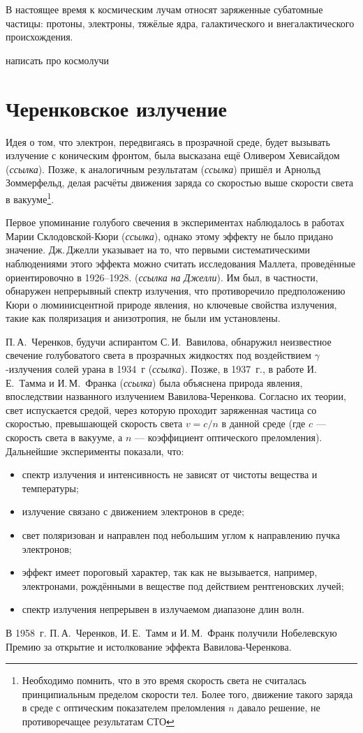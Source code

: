 \documentclass[magd,floatypics,numeref]{msudipl} %
\begin{document}
В настоящее время к космическим лучам относят заряженные субатомные частицы: протоны, электроны, тяжёлые ядра, галактического и внегалактического происхождения. 

написать про космолучи

\section{Черенковское излучение}
Идея о том, что электрон, передвигаясь в прозрачной среде, будет вызывать излучение с коническим фронтом, была высказана ещё Оливером Хевисайдом (\textit{ссылка}).
Позже, к аналогичным результатам (\textit{ссылка}) пришёл и Арнольд Зоммерфельд, делая расчёты движения заряда со скоростью выше скорости света в вакууме\footnote{Необходимо помнить, что в это время скорость света не считалась принципиальным пределом скорости тел. Более того, движение такого заряда в среде с оптическим показателем преломления $n$ давало решение, не противоречащее результатам СТО}. 

Первое упоминание голубого свечения в экспериментах наблюдалось в работах Марии Склодовской-Кюри (\textit{ссылка}), однако этому эффекту не было придано значение. Дж.\,Джелли указывает на то, что первыми систематическими наблюдениями этого эффекта можно считать исследования Маллета, проведённые ориентировочно в 1926--1928. (\textit{ссылка на Джелли}). Им был, в частности, обнаружен непрерывный спектр излучения, что противоречило предположению Кюри о люминисцентной природе явления, но ключевые свойства излучения, такие как поляризация и анизотропия, не были им установлены. 

П.\,А.~Черенков, будучи аспирантом С.\,И.~Вавилова, обнаружил неизвестное свечение голубоватого света в прозрачных жидкостях под воздействием $\gamma$-излучения солей урана в 1934~г (\textit{ссылка}). Позже, в 1937~г., в работе И.\,Е.~Тамма и И.\,М.~Франка (\textit{ссылка}) была объяснена природа явления, впоследствии названного излучением Вавилова-Черенкова. Согласно их теории, свет испускается средой, через которую проходит заряженная частица со скоростью, превышающей скорость света $v=c/n$ в данной среде (где $c$ — скорость света в вакууме, а $n$ --- коэффициент оптического преломления). 
Дальнейшие эксперименты показали, что:
\begin{itemize}
\item спектр излучения и интенсивность не зависят от чистоты вещества и
температуры;
\item излучение связано с движением электронов в среде;
\item свет поляризован и направлен под небольшим углом к направлению
пучка электронов;
\item эффект имеет пороговый характер, так как не вызывается, например,
электронами, рождёнными в веществе под действием рентгеновских
лучей;
\item спектр излучения непрерывен в излучаемом диапазоне длин волн.
\end{itemize}
В 1958~г. П.\,А.~Черенков, И.\,Е.~Тамм и И.\,М.~Франк получили Нобелевскую Премию за открытие и истолкование эффекта Вавилова-Черенкова.
\end{document}
